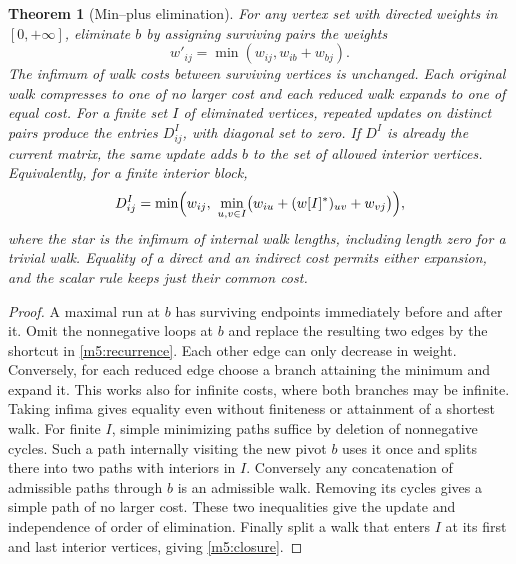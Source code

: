 \documentclass[11pt,reqno]{amsart}
\newtheorem{theorem}{Theorem}[section]
\theoremstyle{definition}
\theoremstyle{remark}
\numberwithin{equation}{section}
\begin{document}
\begin{theorem}[Min--plus elimination]\label{m5:pivot}
For any vertex set with directed weights in \([0,+\infty]\), eliminate \(b\)
by assigning surviving pairs the weights
\begin{equation}\label{m5:recurrence}
 w'_{ij}=\min(w_{ij},w_{ib}+w_{bj}).
\end{equation}
The infimum of walk costs between surviving vertices is unchanged.
Each original walk compresses to one of no larger cost and each reduced
walk expands to one of equal cost. For a finite set \(I\) of eliminated
vertices, repeated updates on distinct pairs produce the entries
\(D^I_{ij}\), with diagonal set to zero. If \(D^I\) is already the
current matrix, the same update adds \(b\) to the set of allowed interior
vertices. Equivalently, for a finite interior block,
\begin{equation}\label{m5:closure}
 D^I_{ij}=\min\Bigl(w_{ij},\
  \min_{u,v\in I}\bigl(w_{iu}+(w[I]^*)_{uv}+w_{vj}\bigr)\Bigr),
\end{equation}
where the star is the infimum of internal walk lengths, including
length zero for a trivial walk. Equality of a direct and an indirect
cost permits either expansion, and the scalar rule keeps just their
common cost.
\end{theorem}
\begin{proof}
A maximal run at \(b\) has surviving endpoints immediately before and
after it. Omit the nonnegative loops at \(b\) and replace the resulting
two edges by the shortcut in \eqref{m5:recurrence}. Each other edge can
only decrease in weight. Conversely, for each reduced edge choose a
branch attaining the minimum and expand it. This works also for infinite
costs, where both branches may be infinite. Taking infima gives equality
even without finiteness or attainment of a shortest walk.
For finite \(I\), simple minimizing paths suffice by deletion of
nonnegative cycles. Such a path internally visiting the new pivot \(b\)
uses it once and splits there into two paths with interiors in \(I\).
Conversely any concatenation of admissible paths through \(b\) is an
admissible walk. Removing its cycles gives a simple path of no larger
cost. These two inequalities give the update and independence of order
of elimination. Finally split a walk that enters \(I\) at its first
and last interior vertices, giving \eqref{m5:closure}.
\end{proof}
\end{document}

